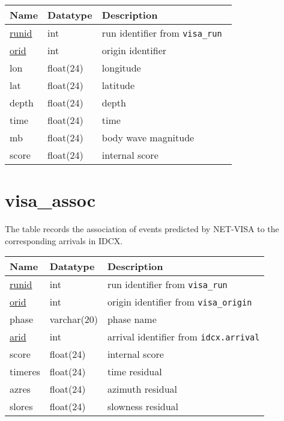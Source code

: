 \begin{center}
\begin{tabular}{|l|l|l|}
\hline
\bf{Name} & \bf{Datatype} & \bf{Description} \\
\hline
 \underline{runid}   & int  & run identifier from \tt{visa\_run} \\
 \underline{orid}    & int  & origin identifier \\
 lon     & float(24)  &  longitude \\
 lat     & float(24)  &  latitude \\
 depth   & float(24)  &  depth \\
 time    & float(24)  &  time \\
 mb      & float(24)  &  body wave magnitude \\
 score   & float(24)  &  internal score \\
\hline
\end{tabular}
\end{center}


\section{visa\_assoc}\label{tbl-visa-assoc}

The table records the association of events predicted by NET-VISA to the
corresponding arrivals in IDCX.

\begin{center}
\begin{tabular}{|l|l|l|}
\hline
\bf{Name} & \bf{Datatype} & \bf{Description} \\
\hline
 \underline{runid}  &  int & run identifier from \tt{visa\_run}\\
 \underline{orid}   &  int & origin identifier from \tt{visa\_origin}\\
 phase  &  varchar(20) & phase name \\
 \underline{arid}   &  int & arrival identifier from \tt{idcx.arrival}\\
 score  &  float(24) & internal score \\
 timeres & float(24) & time residual \\
 azres   & float(24) & azimuth residual \\
 slores  & float(24) & slowness residual \\
\hline
\end{tabular}
\end{center}


